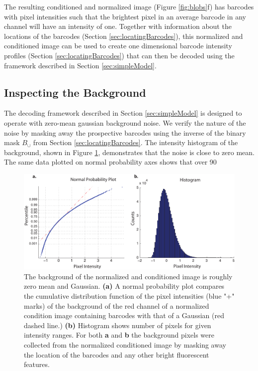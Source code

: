 The resulting conditioned and normalized image (Figure \ref{fig:blobs}f) has barcodes with pixel intensities such that the brightest pixel in an average barcode in any channel will have an intensity of one.  Together with information about the locations of the barcodes (Section \ref{sec:locatingBarcodes}), this normalized and conditioned image can be used to create one dimensional barcode intensity profiles (Section \ref{sec:locatingBarcodes}) that can then be decoded using the framework described in Section \ref{sec:simpleModel}.

\subsection{Inspecting the Background}
The decoding framework described in Section \ref{sec:simpleModel} is designed to operate with zero-mean gaussian background noise. We verify the nature of the noise by masking away the prospective barcodes using the inverse of the binary mask $B_{\cup}$ from Section \ref{sec:locatingBarcodes}.  The intensity histogram of the background, shown in Figure \ref{fig:noisePlots}, demonstrates that the noise is close to zero mean. The same data plotted on normal probability axes shows that over 90%
\begin{figure}[htbp]
\begin{center}
	\includegraphics[width=\textwidth]{figures/theoryBackgroundStatistics}
	\caption{The background of the normalized and conditioned image is roughly zero mean and Gaussian.  \textbf{(a)} A normal probability plot compares the cumulative distribution function of the pixel intensities (blue "+" marks) of the background of the red channel of a normalized condition image containing barcodes  with that of a Gaussian (red dashed line.)  \textbf{(b)} Histogram shows number of pixels for given intensity ranges. For both \textbf{a} and \textbf{b} the background pixels were collected from the normalized conditioned image by masking away the location of the barcodes and any other bright fluorescent features.   \label{fig:noisePlots}}
\end{center}	
\end{figure}


